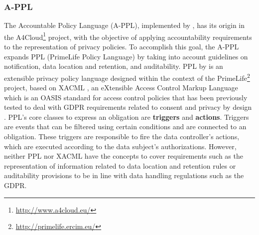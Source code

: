 
\subsubsection{A-PPL}
\label{sec:appl}

The Accountable Policy Language (A-PPL), implemented by \cite{azraoui_appl_2014}, has its origin in the A4Cloud\footnote{\url{http://www.a4cloud.eu/}} project, with the objective of applying accountability requirements to the representation of privacy policies.
To accomplish this goal, the A-PPL expands PPL (PrimeLife Policy Language) by taking into account guidelines on notification, data location and retention, and auditability.
PPL by \cite{ardagna_primelife_2009} is an extensible privacy policy language designed within the context of the PrimeLife\footnote{\url{http://primelife.ercim.eu/}} project, based on XACML \citep{parducci_extensible_2013}, an eXtensible Access Control Markup Language which is an OASIS standard for access control policies that has been previously tested to deal with GDPR requirements related to consent \citep{fatema_compliance_2017} and privacy by design \citep{piras_defend_2019}. %
PPL's core classes to express an obligation are \textbf{triggers} and \textbf{actions}.
Triggers are events that can be filtered using certain conditions and are connected to an obligation.
These triggers are responsible to fire the data controller's actions, which are executed according to the data subject's authorizations.
However, neither PPL nor XACML have the concepts to cover requirements such as the representation of information related to data location and retention rules or auditability provisions to be in line with data handling regulations such as the GDPR.%

